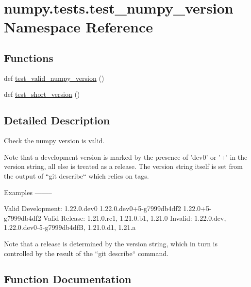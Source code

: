 \hypertarget{namespacenumpy_1_1tests_1_1test__numpy__version}{}\section{numpy.\+tests.\+test\+\_\+numpy\+\_\+version Namespace Reference}
\label{namespacenumpy_1_1tests_1_1test__numpy__version}
\subsection*{Functions}
\begin{DoxyCompactItemize}
\item 
def \hyperlink{namespacenumpy_1_1tests_1_1test__numpy__version_afc8025769277a48514afa1247ca53b21}{test\+\_\+valid\+\_\+numpy\+\_\+version} ()
\item 
def \hyperlink{namespacenumpy_1_1tests_1_1test__numpy__version_aa10155060edd59d013db3baa717cf12b}{test\+\_\+short\+\_\+version} ()
\end{DoxyCompactItemize}


\subsection{Detailed Description}
\begin{DoxyVerb}Check the numpy version is valid.

Note that a development version is marked by the presence of 'dev0' or '+'
in the version string, all else is treated as a release. The version string
itself is set from the output of ``git describe`` which relies on tags.

Examples
--------

Valid Development: 1.22.0.dev0 1.22.0.dev0+5-g7999db4df2 1.22.0+5-g7999db4df2
Valid Release: 1.21.0.rc1, 1.21.0.b1, 1.21.0
Invalid: 1.22.0.dev, 1.22.0.dev0-5-g7999db4dfB, 1.21.0.d1, 1.21.a

Note that a release is determined by the version string, which in turn
is controlled by the result of the ``git describe`` command.
\end{DoxyVerb}
 

\subsection{Function Documentation}
\mbox{\label{namespacenumpy_1_1tests_1_1test__numpy__version_aa10155060edd59d013db3baa717cf12b}} 
